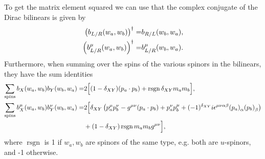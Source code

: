 \documentclass[../main.tex]{subfiles}
\begin{document}
To get the matrix element squared we can use that the complex conjugate of the
Dirac bilinears is given by
\begin{subequations}
  \begin{align}
    \left(b_{L/R}(w_a, w_b)\right)^\dagger =     & b_{R/L}(w_b, w_a),
    \\
    \left(b_{L/R}^\mu(w_a, w_b)\right)^\dagger = & b_{L/R}^\mu(w_b,
    w_a).
  \end{align}
\end{subequations}
Furthermore, when summing over the spins of the various spinors in the
bilinears, they have the sum identities
\begin{align}
  \sum_{\text{spins}} b_X(w_a, w_b) b_Y(w_b, w_a) =         & 2 \Big[
    (1-\delta_{XY}) (p_a \cdot p_b) + \operatorname{rsgn}
    \delta_{XY} m_a m_b
    \Big],
  \\
  \nonumber
  \sum_{\text{spins}} b_X^\mu(w_a, w_b) b_Y^\nu(w_b, w_a) = & 2\Big[
    \delta_{XY}\pclosed{p_a^\mu p_b^\nu - \g (p_a \cdot p_b) +
      p_a^\nu
      p_b^\mu +
      (-1)^{\delta_{XY}} i \epsilon^{\mu\nu\alpha\beta}
      \tensor{(p_a)}{_\alpha}
  \tensor{(p_b)}{_\beta}}                                             \\
                                                            & +
    (1-\delta_{XY})\operatorname{rsgn} m_a m_b \g \Big],
\end{align}
where \(\operatorname{rsgn}\) is 1 if \(w_a, w_b\) are spinors of the same
type, e.g. both are \(u\)-spinors, and -1 otherwise.
\end{document}

